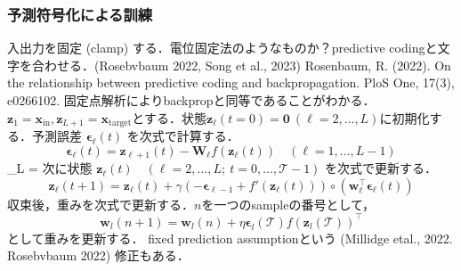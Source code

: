 \subsubsection{予測符号化による訓練}
入出力を固定 (clamp) する．電位固定法のようなものか？predictive codingと文字を合わせる．(Rosebvbaum 2022, Song et al., 2023)
Rosenbaum, R. (2022). On the relationship between predictive coding and backpropagation. PloS One, 17(3), e0266102.
固定点解析によりbackpropと同等であることがわかる．
$\mathbf{z}_1=\mathbf{x}_{\textrm{in}}, \mathbf{z}_{L+1}=\mathbf{x}_{\textrm{target}}$とする．状態$\mathbf{z}_\ell(t=0)=\mathbf{0}\ (\ell=2, \ldots, L)$に初期化する．予測誤差 $\boldsymbol{\epsilon}_\ell(t)$ を次式で計算する．
\begin{equation}
\boldsymbol{\epsilon}_{\ell}(t)=\mathbf{z}_{\ell+1}(t)-\mathbf{W}_{\ell}f(\mathbf{z}_{\ell}(t))\quad(\ell=1, \ldots, L-1)
\end{equation}
\boldsymbol{\epsilon}_{L} = 
次に状態 $\mathbf{z}_\ell(t)\quad (\ell=2, \ldots, L;\  t=0, \ldots, \mathcal{T}-1)$ を次式で更新する．
\begin{equation}
\mathbf{z}_\ell(t+1)=\mathbf{z}_\ell(t)+\gamma (-\boldsymbol{\epsilon}_{\ell-1} + f'(\mathbf{z}_\ell(t))) \circ (\mathbf{w}_\ell^\top \boldsymbol{\epsilon}_{\ell}(t))
\end{equation}
収束後，重みを次式で更新する．$n$を一つのsampleの番号として，
\begin{equation}
\mathbf{w}_l(n+1)=\mathbf{w}_l(n)+\eta \mathbf{\epsilon}_l(\mathcal{T}) f(\mathbf{z}_l(\mathcal{T}))^\top
\end{equation}
として重みを更新する．
fixed prediction assumptionという (Millidge etal., 2022. Rosebvbaum 2022) 修正もある．
